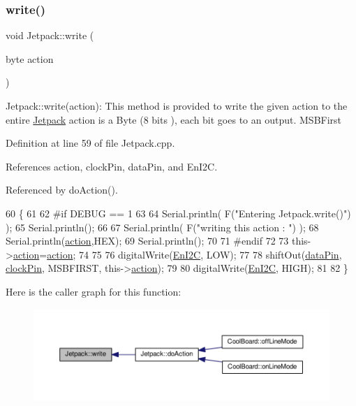 \subsubsection{\texorpdfstring{write()}{write()}}
{\footnotesize\ttfamily void Jetpack\+::write (\begin{DoxyParamCaption}\item[{byte}]{action }\end{DoxyParamCaption})}

Jetpack\+::write(action)\+: This method is provided to write the given action to the entire \hyperlink{classJetpack}{Jetpack} action is a Byte (8 bits ), each bit goes to an output. M\+S\+B\+First 

Definition at line 59 of file Jetpack.\+cpp.



References action, clock\+Pin, data\+Pin, and En\+I2C.



Referenced by do\+Action().


\begin{DoxyCode}
60 \{
61 
62 \textcolor{preprocessor}{#if DEBUG == 1}
63 
64     Serial.println( F(\textcolor{stringliteral}{"Entering Jetpack.write()"}) );
65     Serial.println();
66 
67     Serial.println( F(\textcolor{stringliteral}{"writing this action : "}) );
68     Serial.println(\hyperlink{classJetpack_aca3142925a7b0834b34ae91d26af7765}{action},HEX);
69     Serial.println();
70 
71 \textcolor{preprocessor}{#endif }
72 
73     this->\hyperlink{classJetpack_aca3142925a7b0834b34ae91d26af7765}{action}=\hyperlink{classJetpack_aca3142925a7b0834b34ae91d26af7765}{action};
74 
75     
76     digitalWrite(\hyperlink{classJetpack_a81df984fb4cea98c71aa1a1cfcdfe814}{EnI2C}, LOW);
77     
78     shiftOut(\hyperlink{classJetpack_a3d669a56e93c71dd25f970d4ed7d0c00}{dataPin}, \hyperlink{classJetpack_a58ebb991f358f3ae94e82148b0221b5a}{clockPin}, MSBFIRST, this->\hyperlink{classJetpack_aca3142925a7b0834b34ae91d26af7765}{action});
79 
80     digitalWrite(\hyperlink{classJetpack_a81df984fb4cea98c71aa1a1cfcdfe814}{EnI2C}, HIGH);
81 
82 \}   
\end{DoxyCode}
Here is the caller graph for this function\+:\nopagebreak
\begin{figure}[H]
\begin{center}
\leavevmode
\includegraphics[width=350pt]{classJetpack_a338f1af8cbc6504ac69b47c7328569b5_icgraph}
\end{center}
\end{figure}
\mbox{\label{classJetpack_a79ae7bc3c1828a0551a7c005c4f8bd00}} 
